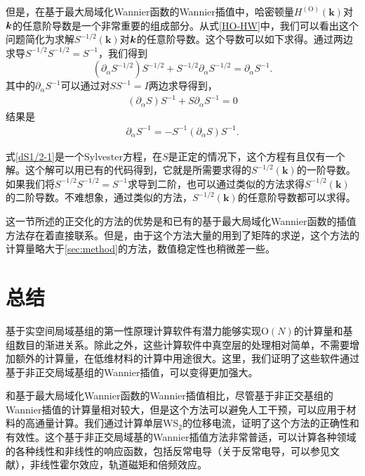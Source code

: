 但是，在基于最大局域化Wannier函数的Wannier插值中，哈密顿量$H^{(\text{O})}(\boldsymbol{k})$对$\boldsymbol{k}$的任意阶导数是一个非常重要的组成部分。从式\ref{HO-HW}中，我们可以看出这个问题简化为求解$S^{-1/2}(\boldsymbol{k})$对$\boldsymbol{k}$的任意阶导数。这个导数可以如下求得。通过两边求导$S^{-1/2}S^{-1/2}=S^{-1}$，我们得到
\begin{equation}
(\partial_{\alpha}S^{-1/2})S^{-1/2}+S^{-1/2}\partial_{\alpha}S^{-1/2}=\partial_{\alpha}S^{-1}.\label{dS1/2-1}
\end{equation}
其中的$\partial_{\alpha}S^{-1}$可以通过对$SS^{-1}=I$两边求导得到，
\begin{align}
(\partial_{\alpha}S)S^{-1}+S\partial_{\alpha}S^{-1}=0
\end{align}
结果是
\begin{align}
\partial_{\alpha}S^{-1} = -S^{-1}(\partial_{\alpha}S)S^{-1}.
\end{align}

式\ref{dS1/2-1}是一个Sylvester方程\cite{sylvester}，在$S$是正定的情况下，这个方程有且仅有一个解。这个解可以用已有的代码得到\cite{laug}，它就是所需要求得的$S^{-1/2}(\boldsymbol{k})$的一阶导数。如果我们将$S^{-1/2}S^{-1/2}=S^{-1}$求导到二阶，也可以通过类似的方法求得$S^{-1/2}(\boldsymbol{k})$的二阶导数。不难想象，通过类似的方法，$S^{-1/2}(\boldsymbol{k})$的任意阶导数都可以求得。


这一节所述的正交化的方法的优势是和已有的基于最大局域化Wannier函数的插值方法存在着直接联系。但是，由于这个方法大量的用到了矩阵的求逆，这个方法的计算量略大于\ref{sec:method}的方法，数值稳定性也稍微差一些。


\section{总结}

基于实空间局域基组的第一性原理计算软件有潜力能够实现$\text{O}(N)$的计算量和基组数目的渐进关系。除此之外，这些计算软件中真空层的处理相对简单，不需要增加额外的计算量，在低维材料的计算中用途很大。这里，我们证明了这些软件通过基于非正交局域基组的Wannier插值，可以变得更加强大。

和基于最大局域化Wannier函数的Wannier插值相比，尽管基于非正交基组的Wannier插值的计算量相对较大，但是这个方法可以避免人工干预，可以应用于材料的高通量计算。我们通过计算单层WS$_2$的位移电流，证明了这个方法的正确性和有效性。这个基于非正交局域基的Wannier插值方法非常普适，可以计算各种领域的各种线性和非线性的响应函数\cite{tokura_nonreciprocal_2018}，包括反常电导（关于反常电导，可以参见文献），非线性霍尔效应，轨道磁矩和倍频效应。

